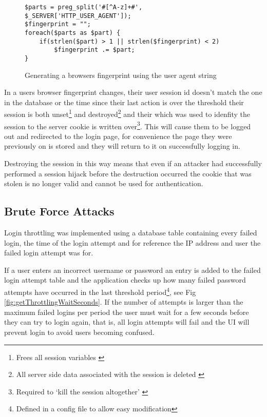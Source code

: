 \begin{figure}
\centering
\begin{lstlisting}[style=phpcolor]
$parts = preg_split('#[^A-z]+#', $_SERVER['HTTP_USER_AGENT']);
$fingerprint = "";
foreach($parts as $part) {
	if(strlen($part) > 1 || strlen($fingerprint) < 2)
		$fingerprint .= $part;
}
\end{lstlisting}
\caption{Generating a browsers fingerprint using the user agent string}
\label{fig:fingerprinting}
\end{figure}

In a users browser fingerprint changes, their user session id doesn't match the one in the database or the time since their last action is over the threshold their session is both unset\footnote{Frees all session variables \parencite{php2014sessionunset}} and destroyed\footnote{All server side data associated with the session is deleted \parencite{php2014sessiondesroy}} and their which was used to idenfity the session to the server cookie is written over\footnote{Required to `kill the session altogether' \parencite{php2014sessiondesroy}}. This will cause them to be logged out and redirected to the login page, for convenience the page they were previously on is stored and they will return to it on successfully logging in.

Destroying the session in this way means that even if an attacker had successfully performed a session hijack before the destruction occurred the cookie that was stolen is no longer valid and cannot be used for authentication.

\subsection{Brute Force Attacks}

Login throttling was implemented using a database table containing every failed login, the time of the login attempt and for reference the IP address and user the failed login attempt was for.

If a user enters an incorrect username or password an entry is added to the failed login attempt table and the application checks up how many failed password attempts have occurred in the last threshold period\footnote{Defined in a config file to allow easy modification}, see Fig \ref{fig:getThrottlingWaitSeconds}.
%
If the number of attempts is larger than the maximum failed logins per period the user must wait for a few seconds before they can try to login again, that is, all login attempts will fail and the UI will prevent login to avoid users becoming confused.


